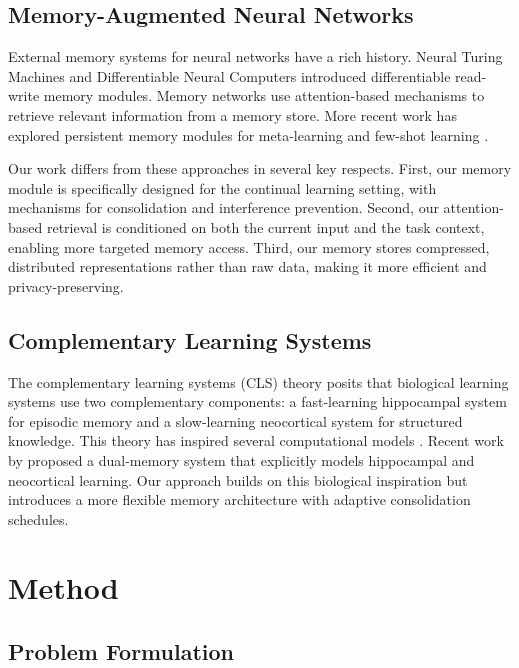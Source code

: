 \documentclass[11pt]{article}
\begin{document}
\subsection{Memory-Augmented Neural Networks}

External memory systems for neural networks have a rich history. Neural Turing Machines \citep{graves2014neural} and Differentiable Neural Computers \citep{graves2016hybrid} introduced differentiable read-write memory modules. Memory networks \citep{weston2014memory, sukhbaatar2015end} use attention-based mechanisms to retrieve relevant information from a memory store. More recent work has explored persistent memory modules for meta-learning \citep{santoro2016meta, munkhdalai2017meta} and few-shot learning \citep{kaiser2017learning}.

Our work differs from these approaches in several key respects. First, our memory module is specifically designed for the continual learning setting, with mechanisms for consolidation and interference prevention. Second, our attention-based retrieval is conditioned on both the current input and the task context, enabling more targeted memory access. Third, our memory stores compressed, distributed representations rather than raw data, making it more efficient and privacy-preserving.

\subsection{Complementary Learning Systems}

The complementary learning systems (CLS) theory \citep{mcclelland1995there} posits that biological learning systems use two complementary components: a fast-learning hippocampal system for episodic memory and a slow-learning neocortical system for structured knowledge. This theory has inspired several computational models \citep{kumaran2016learning, zenke2017continual}. Recent work by \citet{arani2022learning} proposed a dual-memory system that explicitly models hippocampal and neocortical learning. Our approach builds on this biological inspiration but introduces a more flexible memory architecture with adaptive consolidation schedules.

\section{Method}
\label{sec:method}

\subsection{Problem Formulation}
\end{document}
